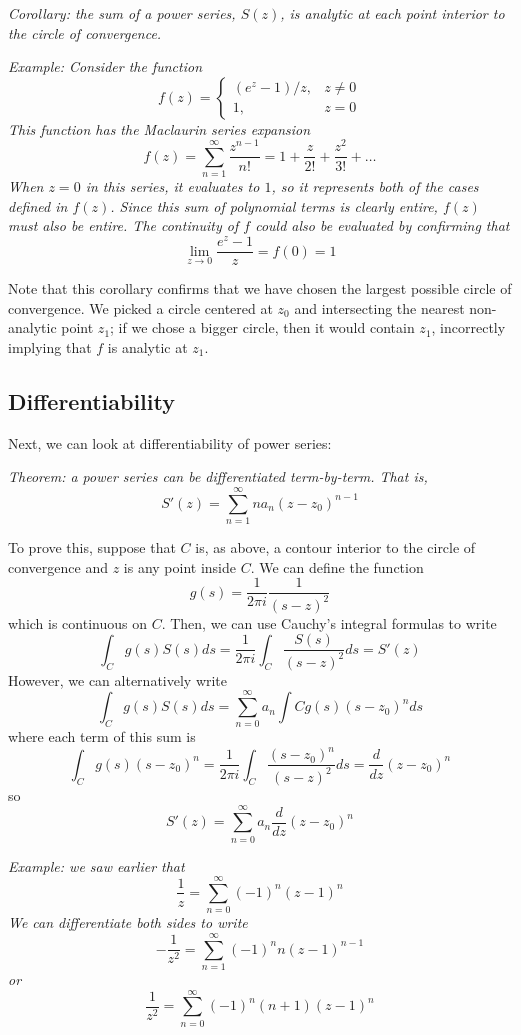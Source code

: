 \documentclass{article}
\begin{document}
\textit{Corollary: the sum of a power series, $S(z)$, is analytic at each point interior to the circle of convergence.}

\textit{Example: Consider the function
\[
	f(z) = \begin{cases}
		(e^z - 1) / z,	& z \neq 0 \\
		1,				& z = 0
	\end{cases}
\]
This function has the Maclaurin series expansion
\[
	f(z) = \sum_{n=1}^\infty \frac{z^{n-1}}{n!}
	= 1 + \frac{z}{2!} + \frac{z^2}{3!} + \dots
\]
When $z = 0$ in this series, it evaluates to $1$, so it represents both of the cases defined in $f(z)$. Since this sum of polynomial terms is clearly entire, $f(z)$ must also be entire. The continuity of $f$ could also be evaluated by confirming that
\[
	\lim_{z \to 0} \frac{e^z - 1}{z} = f(0) = 1
\]}

Note that this corollary confirms that we have chosen the largest possible circle of convergence. We picked a circle centered at $z_0$ and intersecting the nearest non-analytic point $z_1$; if we chose a bigger circle, then it would contain $z_1$, incorrectly implying that $f$ is analytic at $z_1$.

\subsection{Differentiability}
Next, we can look at differentiability of power series:

\textit{Theorem: a power series can be differentiated term-by-term. That is,
\[
	S'(z) = \sum_{n=1}^\infty na_n (z - z_0)^{n-1}
\]}

To prove this, suppose that $C$ is, as above, a contour interior to the circle of convergence and $z$ is any point inside $C$. We can define the function
\[
	g(s) = \frac{1}{2\pi i} \frac{1}{(s - z)^2}
\]
which is continuous on $C$. Then, we can use Cauchy's integral formulas to write
\[
	\int_C g(s) S(s) ds 
	= \frac{1}{2\pi i} \int_C \frac{S(s)}{(s - z)^2} ds = S'(z) 
\]
However, we can alternatively write
\[
	\int_C g(s) S(s) ds = \sum_{n=0}^\infty a_n \int C g(s) (s - z_0)^n ds
\]
where each term of this sum is
\[
	\int_C g(s) (s - z_0)^n
	= \frac{1}{2\pi i} \int_C \frac{(s - z_0)^n}{(s - z)^2} ds
	= \frac{d}{dz} (z - z_0)^n
\]
so
\[
	S'(z) = \sum_{n=0}^\infty a_n \frac{d}{dz} (z - z_0)^n
\]

\textit{Example: we saw earlier that
\[
	\frac{1}{z} = \sum_{n=0}^\infty (-1)^n (z - 1)^n
\]
We can differentiate both sides to write
\[
	-\frac{1}{z^2} = \sum_{n=1}^\infty (-1)^n n(z - 1)^{n-1}
\]
or
\[
	\frac{1}{z^2} = \sum_{n=0}^\infty (-1)^n (n+1) (z - 1)^n
\]}
\end{document}
